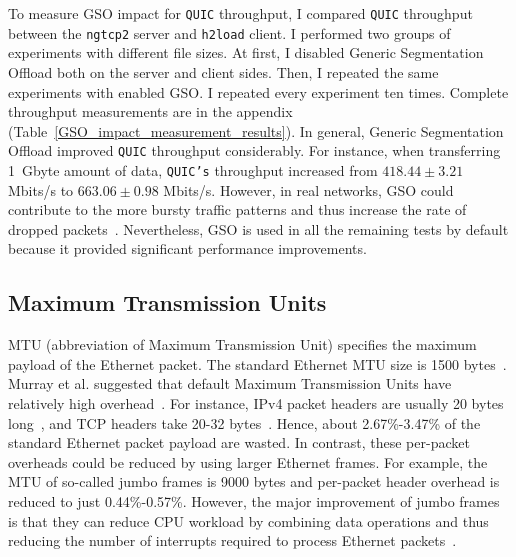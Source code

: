 \documentclass[12pt,a4paper]{report}
\begin{document}
    To measure GSO impact for \texttt{QUIC} throughput, I compared \texttt{QUIC} throughput between the \texttt{ngtcp2} server and \texttt{h2load} client.
    I performed two groups of experiments with different file sizes.
    At first, I disabled Generic Segmentation Offload both on the server and client sides.
    Then, I repeated the same experiments with enabled GSO.
    I repeated every experiment ten times.
    Complete throughput measurements are in the appendix (Table~\ref{GSO_impact_measurement_results}).
    In general, Generic Segmentation Offload improved \texttt{QUIC} throughput considerably.
    For instance, when transferring 1~Gbyte amount of data, \texttt{QUIC's} throughput increased from $418.44 \pm 3.21$ Mbits/s to $663.06 \pm 0.98$ Mbits/s.
    However, in real networks, GSO could contribute to the more bursty traffic patterns and thus increase the rate of dropped packets~\cite{accelerating-udp-packet-transmission-for-quic}.
    Nevertheless, GSO is used in all the remaining tests by default because it provided significant performance improvements.


\subsection{Maximum Transmission Units}
  MTU (abbreviation of Maximum Transmission Unit) specifies the maximum payload of the Ethernet packet.
  The standard Ethernet MTU size is 1500 bytes~\cite{The_Ethernet_Frame_Payload_Size_and_Its_Effect_on_IPv4_and_IPv6_Traffic}. 
  Murray et al. suggested that default Maximum Transmission Units have relatively high overhead~\cite{Large_MTUs_and_Internet_Performance}.
  For instance, IPv4 packet headers are usually 20 bytes long~\cite{FallKevinR2012TiV1}, and TCP headers take 20-32 bytes~\cite{Large_MTUs_and_Internet_Performance}.
  Hence, about 2.67\%-3.47\% of the standard Ethernet packet payload are wasted.
  In contrast, these per-packet overheads could be reduced by using larger Ethernet frames.
  For example, the MTU of so-called jumbo frames is 9000 bytes and per-packet header overhead is reduced to just 0.44\%-0.57\%.
  However, the major improvement of jumbo frames is that they can reduce CPU workload by combining data operations and thus reducing the number of interrupts required to process Ethernet packets~\cite{Extended_rame_Sizes_for_Next_Generation_Ethernets}.
  
\end{document}
